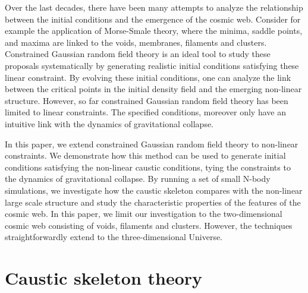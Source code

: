 \documentclass[a4paper, 11pt]{article}
\begin{document}
Over the last decades, there have been many attempts to analyze the relationship between the initial conditions and the emergence of the cosmic web. Consider for example the application of Morse-Smale theory, where the minima, saddle points, and maxima are linked to the voids, membranes, filaments and clusters. Constrained Gaussian random field theory is an ideal tool to study these proposals systematically by generating realistic initial conditions satisfying these linear constraint. By evolving these initial conditions, one can analyze the link between the critical points in the initial density field and the emerging non-linear structure. However, so far constrained Gaussian random field theory has been limited to linear constraints. The specified conditions, moreover only have an intuitive link with the dynamics of gravitational collapse. 

In this paper, we extend constrained Gaussian random field theory to non-linear constraints. We demonstrate how this method can be used to generate initial conditions satisfying the non-linear caustic conditions, tying the constraints to the dynamics of gravitational collapse. By running a set of small N-body simulations, we investigate how the caustic skeleton compares with the non-linear large scale structure and study the characteristic properties of the features of the cosmic web. In this paper, we limit our investigation to the two-dimensional cosmic web consisting of voids, filaments and clusters. However, the techniques straightforwardly extend to the three-dimensional Universe.

















\section{Caustic skeleton theory}
 


\end{document}
